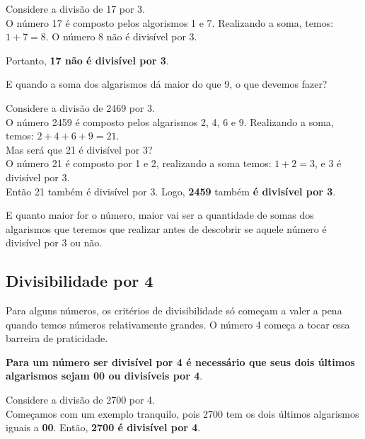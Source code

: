 \begin{exemplo}
    Considere a divisão de 17 por 3.\\

    O número 17 é composto pelos algorismos 1 e 7. Realizando a soma, temos: \(1+7=8\). O número 8 não é divisível por 3.

    Portanto, \textbf{17 não é divisível por 3}.
\end{exemplo}

E quando a soma dos algarismos dá maior do que 9, o que devemos fazer?

\begin{exemplo}
    Considere a divisão de 2469 por 3.\\

    O número 2459 é composto pelos algarismos 2, 4, 6 e 9. Realizando a soma, temos: \(2+4+6+9=21\). \\
    
    Mas será que 21 é divisível por 3?\\

    O número 21 é composto por 1 e 2, realizando a soma temos: \(1+2=3\), e 3 é divisível por 3. \\
    
    Então 21 também é divisível por 3. Logo, \textbf{2459} também \textbf{é divisível por 3}.
\end{exemplo}

E quanto maior for o número, maior vai ser a quantidade de somas dos algarismos que teremos que realizar antes de descobrir se aquele número é divisível por 3 ou não.

\subsection{Divisibilidade por 4}
Para alguns números, os critérios de divisibilidade só começam a valer a pena quando temos números relativamente grandes. O número 4 começa a tocar essa barreira de praticidade.

\textbf{Para um número ser divisível por 4 é necessário que seus dois últimos algarismos sejam 00 ou divisíveis por 4}. 

\begin{exemplo}
    Considere a divisão de 2700 por 4.\\

    Começamos com um exemplo tranquilo, pois 2700 tem os dois últimos algarismos iguais a \textbf{00}. Então, \textbf{2700 é divisível por 4}.
\end{exemplo}

